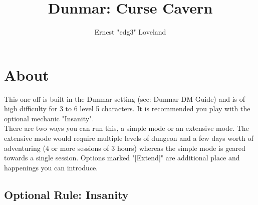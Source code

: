 \documentclass[10pt,twoside,twocolumn]{article}
\title{Dunmar: Curse Cavern}
\author{Ernest "edg3" Loveland}
\begin{document}
\selectfont %

\maketitle
\tableofcontents


\section{About}
This one-off is built in the Dunmar setting (see: Dunmar DM Guide) and is of high difficulty for 3 to 6 level 5 characters. It is recommended you play with the optional mechanic "Insanity". \\

There are two ways you can run this, a simple mode or an extensive mode. The extensive mode would require multiple levels of dungeon and a few days worth of adventuring (4 or more sessions of 3 hours) whereas the simple mode is geared towards a single session. Options marked "[Extend]" are additional place and happenings you can introduce.

\subsection{Optional Rule: Insanity}
\end{document}
